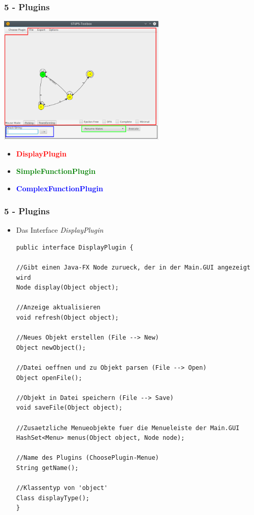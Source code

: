 \documentclass[9pt, xcolor={dvipsnames}]{beamer}
\begin{document}
\begin{frame}\frametitle{5 - Plugins}
	\begin{center}\includegraphics[width=0.6\textwidth]{fig/gui.png}\end{center}
	\begin{itemize}
		\item \textcolor{red}{\textbf{DisplayPlugin}}
		\item \textcolor{green}{\textbf{SimpleFunctionPlugin}}
		\item \textcolor{blue}{\textbf{ComplexFunctionPlugin}}
	\end{itemize}
\end{frame}

\begin{frame}[fragile]\frametitle{5 - Plugins}
	\begin{itemize}
		\item[] Das Interface \textit{DisplayPlugin}
		\begin{lstlisting}[frame=single, basicstyle=\tiny]
public interface DisplayPlugin {

//Gibt einen Java-FX Node zurueck, der in der Main.GUI angezeigt wird
Node display(Object object);

//Anzeige aktualisieren
void refresh(Object object);

//Neues Objekt erstellen (File --> New)
Object newObject();

//Datei oeffnen und zu Objekt parsen (File --> Open)
Object openFile();

//Objekt in Datei speichern (File --> Save)
void saveFile(Object object);

//Zusaetzliche Menueobjekte fuer die Menueleiste der Main.GUI
HashSet<Menu> menus(Object object, Node node);

//Name des Plugins (ChoosePlugin-Menue)
String getName();

//Klassentyp von 'object'
Class displayType();
}
		\end{lstlisting}
	\end{itemize}
\end{frame}
\end{document}

